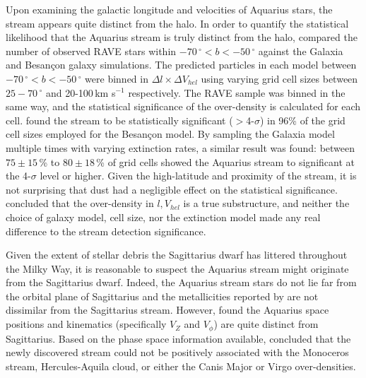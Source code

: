 \documentclass{emulateapj}
\begin{document}
Upon examining the galactic longitude and velocities of Aquarius stars, the stream appears quite distinct from the halo. In order to quantify the statistical likelihood that the Aquarius stream is truly distinct from the halo, \citet{williams;et-al_2011} compared the number of observed RAVE stars within $-70\,^\circ < b < -50\,^\circ$ against the Galaxia \citep{sharma;et-al_2011} and Besan\c{c}on \citep{robin;et-al_2003} galaxy simulations. The predicted particles in each model between $-70\,^\circ < b < -50\,^\circ$ were binned in $\Delta{l} \times \Delta{V_{hel}}$ using varying grid cell sizes between $25-70\,^\circ$ and 20-100\,km s$^{-1}$ respectively. The RAVE sample was binned in the same way, and the statistical significance of the over-density is calculated for each cell. \citet{williams;et-al_2011} found the stream to be statistically significant ($>$4-$\sigma$) in 96\% of the grid cell sizes employed for the Besan\c{c}on model. By sampling the Galaxia model multiple times with varying extinction rates, a similar result was found: between $75\pm15$\,\% to $80\pm18$\,\% of grid cells showed the Aquarius stream to significant at the 4-$\sigma$ level or higher. Given the high-latitude and proximity of the stream, it is not surprising that dust had a negligible effect on the statistical significance. \citet{williams;et-al_2011} concluded that the over-density in $l, V_{hel}$ is a true substructure, and neither the choice of galaxy model, cell size, nor the extinction model made any real difference to the stream detection significance.




Given the extent of stellar debris the Sagittarius dwarf has littered throughout the Milky Way, it is reasonable to suspect the Aquarius stream might originate from the Sagittarius dwarf. Indeed, the Aquarius stream stars do not lie far from the orbital plane of Sagittarius and the metallicities reported by \citet{williams;et-al_2011} are not dissimilar from the Sagittarius stream. However, \citet{williams;et-al_2011} found the Aquarius space positions and kinematics (specifically $V_{Z}$ and $V_\phi$) are quite distinct from Sagittarius. Based on the phase space information available, \citet{williams;et-al_2011} concluded that the newly discovered stream could not be positively associated with the Monoceros stream, Hercules-Aquila cloud, or either the Canis Major or Virgo over-densities. 
\end{document}
